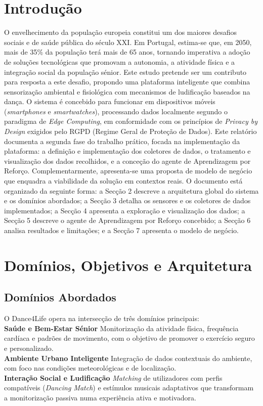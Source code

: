 \documentclass[runningheads]{llncs}
\begin{document}
\section{Introdução}
O envelhecimento da população europeia constitui um dos maiores desafios sociais e de saúde pública do século XXI. Em Portugal, estima-se que, em 2050, mais de 35\% da população terá mais de 65 anos, tornando imperativa a adoção de soluções tecnológicas que promovam a autonomia, a atividade física e a integração social da população sénior.
Este estudo pretende ser um contributo para resposta a este desafio, propondo uma plataforma inteligente que combina sensorização ambiental e fisiológica com mecanismos de ludificação baseados na dança. O sistema é concebido para funcionar em dispositivos móveis (\textit{smartphones} e \textit{smartwatches}), processando dados localmente segundo o paradigma de \textit{Edge Computing}, em conformidade com os princípios de \textit{Privacy by Design} exigidos pelo RGPD (Regime Geral de Proteção de Dados).
Este relatório documenta a segunda fase do trabalho prático, focada na implementação da plataforma: a definição e implementação dos coletores de dados, o tratamento e visualização dos dados recolhidos, e a conceção do agente de Aprendizagem por Reforço. Complementarmente, apresenta-se uma proposta de modelo de negócio que enquadra a viabilidade da solução em contextos reais.
O documento está organizado da seguinte forma: a Secção 2 descreve a arquitetura global do sistema e os domínios abordados; a Secção 3 detalha os sensores e os coletores de dados implementados; a Secção 4 apresenta a exploração e visualização dos dados; a Secção 5 descreve o agente de Aprendizagem por Reforço concebido; a Secção 6 analisa resultados e limitações; e a Secção 7 apresenta o modelo de negócio.

\section{Domínios, Objetivos e Arquitetura}
\subsection{Domínios Abordados}
O Dance4Life opera na intersecção de três domínios principais:\\
\textbf{Saúde e Bem-Estar Sénior} Monitorização da atividade física, frequência cardíaca e padrões de movimento, com o objetivo de promover o exercício seguro e personalizado.\\
\textbf{Ambiente Urbano Inteligente} Integração de dados contextuais do ambiente, com foco nas condições meteorológicas e de localização.\\
\textbf{Interação Social e Ludificação} \textit{Matching} de utilizadores com perfis compatíveis (\textit{Dancing Match}) e estímulos musicais adaptativos que transformam a monitorização passiva numa experiência ativa e motivadora.
\end{document}
